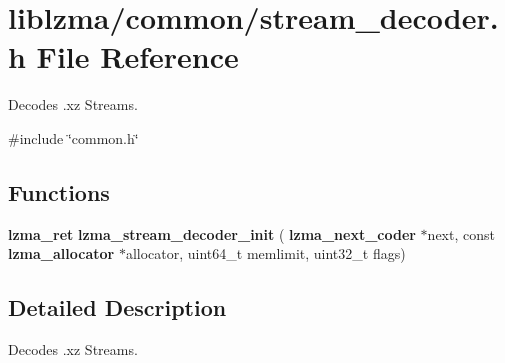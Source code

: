 \section{liblzma/common/stream\+\_\+decoder.h File Reference}
\label{stream__decoder_8h}


Decodes .xz Streams.  


{\ttfamily \#include \char`\"{}common.\+h\char`\"{}}\newline
\subsection*{Functions}
\begin{DoxyCompactItemize}
\item 
\mbox{\label{stream__decoder_8h_ae42fcadce8bb630b0653e5f057aa2c9d}} 
\textbf{ lzma\+\_\+ret} {\bfseries lzma\+\_\+stream\+\_\+decoder\+\_\+init} (\textbf{ lzma\+\_\+next\+\_\+coder} $\ast$next, const \textbf{ lzma\+\_\+allocator} $\ast$allocator, uint64\+\_\+t memlimit, uint32\+\_\+t flags)
\end{DoxyCompactItemize}


\subsection{Detailed Description}
Decodes .xz Streams. 

